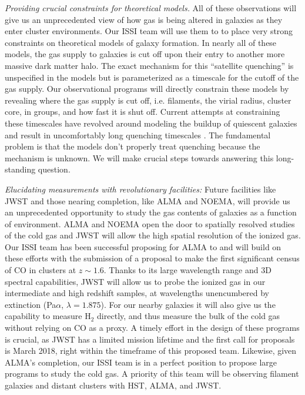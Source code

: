 \documentclass[11pt]{article}
\begin{document}
\textit{Providing crucial constraints for theoretical models.} All of
these observations will give us an unprecedented view of how gas is
being altered in galaxies as they enter cluster environments.  Our
ISSI team will use them to to place very strong constraints on
theoretical models of galaxy formation.  In nearly all of these
models, the gas supply to galaxies is cut off upon their entry to
another more massive dark matter halo.  The exact mechanism for this
``satellite quenching'' is unspecified in the models but is
parameterized as a timescale for the cutoff of the gas supply.  Our
observational programs will directly constrain these models by revealing where the gas supply is cut off, i.e. filaments, the virial radius, cluster
core, in groups, and how fast it is shut off.  Current
attempts at constraining these timescales have revolved around
modeling the buildup of quiescent galaxies and result in uncomfortably
long quenching timescales \citep{McGee11,DeLucia12a}. The fundamental
problem is that the models don't properly treat quenching because the
mechanism is unknown.  We will make crucial steps towards answering
this long-standing question.

\textit{Elucidating measurements with revolutionary facilities:}
Future facilities like JWST and those nearing completion, like ALMA and NOEMA,
will provide us an unprecedented opportunity to study the gas contents
of galaxies as a function of environment.  ALMA and NOEMA open the door to
spatially resolved studies of the cold gas and JWST will allow
the high spatial resolution of the ionized gas.  Our ISSI team has been successful proposing for ALMA to and will build on these efforts with the submission of a proposal to make the first significant census of CO in clusters at $z\sim 1.6$.  Thanks to its large wavelength range and 3D spectral capabilities, JWST will allow us to probe the ionized gas in our intermediate and high redshift samples, at wavelengths unencumbered by extinction (Pa$\alpha$, $\lambda=1.875$\micron).  For our nearby galaxies it will also give us the capability to measure H$_2$ directly, and thus measure the bulk of the cold gas without relying on CO as a proxy.  
A timely effort in the design of these programs is crucial, as JWST has a limited mission lifetime and the first call for proposals is March 2018, right within the timeframe of this proposed team.  
Likewise, given ALMA's completion, our ISSI team
is in a perfect position to propose large programs to study the
cold gas.  A priority of this team will be observing filament galaxies and distant clusters with HST, ALMA, and JWST.
\end{document}
